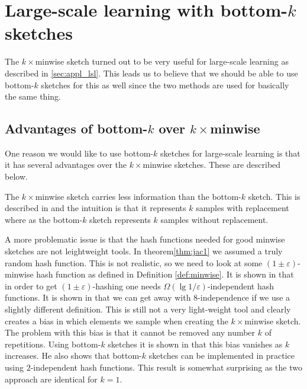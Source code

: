 \chapter{Large-scale learning with bottom-$k$ sketches}

The $k\times$minwise sketch turned out to be very useful for large-scale
learning as described in \autoref{sec:appl_lsl}. This leads us to believe
that we should be able to use bottom-$k$ sketches for this as well since
the two methods are used for basically the same thing.

\section{Advantages of bottom-$k$ over $k\times$minwise}\label{sec:adv}
One reason we would like to use bottom-$k$ sketches for large-scale learning
is that it has several advantages over the $k\times$minwise sketches.
These are described below.

The $k\times$minwise sketch carries less information than the bottom-$k$
sketch. This is described in \cite{Cohen07} and the intuition is that it
represents $k$ samples with replacement where as the bottom-$k$ sketch
represents $k$ samples without replacement.

A more problematic issue is that the hash functions needed for good minwise
sketches are not leightweight tools. In theorem\autoref{thm:jac1} we assumed
a truly random hash function. This is not realistic, so we need to look at
some $(1\pm\varepsilon)$-minwise hash function as defined in Definition
\autoref{def:minwise}. It is shown in \cite{Thorup10} that in order to get
$(1\pm\varepsilon)$-hashing one needs $\Omega(\lg 1/\varepsilon)$-independent
hash functions. It is shown in \cite{feigenblat12} that we can get away with
$8$-independence if we use a slightly different definition. This is still
not a very light-weight tool and clearly creates a bias in which elements
we sample when creating the $k\times$minwise sketch. The problem with this
bias is that it cannot be removed any number $k$ of repetitions. Using
bottom-$k$ sketches it is shown in \cite{Thorup12} that this bias vanishes
as $k$ increases. He also shows that bottom-$k$ sketches can be implemented
in practice using $2$-independent hash functions. This result is somewhat
surprising as the two approach are identical for $k=1$.

